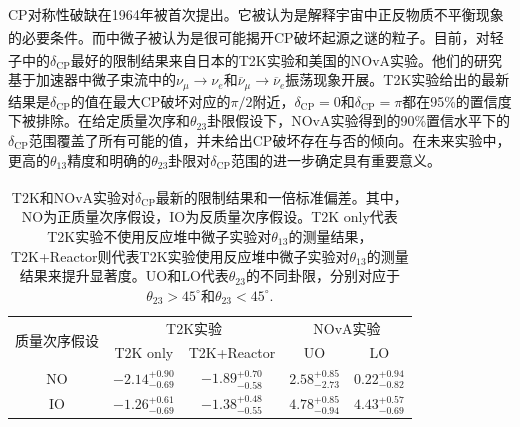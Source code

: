 \documentclass[a4paper,zihao=-4]{article}
\newcommand{\citess}[1]{\textsuperscript{\cite{#1}}}
\begin{document}
\paragraph{}CP对称性破缺在1964年被首次提出\citess{Christenson:1964fg}。它被认为是解释宇宙中正反物质不平衡现象的必要条件\citess{Sakharov:1967dj}。而中微子被认为是很可能揭开CP破坏起源之谜的粒子。目前，对轻子中的$\delta_{\text{CP}}$最好的限制结果来自日本的T2K实验\citess{T2K:2021xwb}和美国的NOvA实验\citess{NOvA:2021nfi}。他们的研究基于加速器中微子束流中的$\nu_\mu\to\nu_e$和$\overline{\nu}_\mu\to\overline{\nu}_e$振荡现象开展。T2K实验给出的最新结果是$\delta_{\text{CP}}$的值在最大CP破坏对应的$\pi/2$附近，$\delta_{\text{CP}}=0$和$\delta_{\text{CP}}=\pi$都在95\%的置信度下被排除。在给定质量次序和$\theta_{23}$卦限假设下，NOvA实验得到的90\%置信水平下的$\delta_{\text{CP}}$范围覆盖了所有可能的值，并未给出CP破坏存在与否的倾向。在未来实验中，更高的$\theta_{13}$精度和明确的$\theta_{23}$卦限对$\delta_{\text{CP}}$范围的进一步确定具有重要意义。
\begin{table}[htb!]
	\centering
	\setlength{\tabcolsep}{10pt}
	\caption{T2K\citess{T2K:2021xwb}和NOvA\citess{NOvA:2021nfi}实验对$\delta_{\text{CP}}$最新的限制结果和一倍标准偏差。其中，NO为正质量次序假设，IO为反质量次序假设。T2K only代表T2K实验不使用反应堆中微子实验对$\theta_{13}$的测量结果，T2K+Reactor则代表T2K实验使用反应堆中微子实验对$\theta_{13}$的测量结果来提升显著度。UO和LO代表$\theta_{23}$的不同卦限，分别对应于$\theta_{23}>45^\circ$和$\theta_{23}<45^\circ$.}
	\begin{tabular}{ccccc}
		\toprule
		\multirow{2}{*}{质量次序假设} & \multicolumn{2}{c}{T2K实验} & \multicolumn{2}{c}{NOvA实验} \\ 
		\cmidrule{2-3} \cmidrule{4-5}
	& \multicolumn{1}{c}{T2K only} & \multicolumn{1}{c}{T2K+Reactor} & \multicolumn{1}{c}{UO} & \multicolumn{1}{c}{LO} \\
		\midrule          
		NO & $-2.14^{+0.90}_{-0.69}$ & $-1.89^{+0.70}_{-0.58}$ & $2.58^{+0.85}_{-2.73}$ & $0.22^{+0.94}_{-0.82}$ \\
		IO & $-1.26^{+0.61}_{-0.69}$ & $-1.38^{+0.48}_{-0.55}$ & $4.78^{+0.85}_{-0.94}$ & $4.43^{+0.57}_{-0.69}$ \\
		\bottomrule
	\end{tabular}%
	\label{tab:CP-measurements}%
\end{table}%
\end{document}
